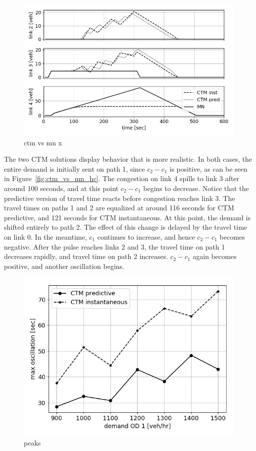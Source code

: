 \begin{figure}[h]
    \centering
    \includegraphics[width=\linewidth]{figs/ctm_vs_mn_x.png}
    \caption{ctm vs mn x}
    \label{fig:ctm_vs_mn_x}
\end{figure}
The two CTM solutions display behavior that is more realistic. In both cases, the entire demand is initially sent on path 1, since $c_2-c_1$ is positive, as can be seen in Figure~\ref{fig:ctm_vs_mn_hc}. The congestion on link 4 spills to link 3 after around 100 seconds, and at this point $c_2-c_1$ begins to decrease. Notice that the predictive version of travel time reacts before congestion reaches link 3. The travel times on paths 1 and 2 are equalized at around 116 seconds for CTM predictive, and 121 seconds for CTM instantaneous. At this point, the demand is shifted entirely to path 2. The effect of this change is delayed by the travel time on link 0. In the meantime, $c_1$ continues to increase, and hence $c_2-c_1$ becomes negative. After the pulse reaches links 2 and 3, the travel time on path 1 decreases rapidly, and travel time on path 2 increases. $c_2-c_1$ again becomes positive, and another oscillation begins. 

\begin{figure}[h]
    \centering
    \includegraphics[width=0.9\linewidth]{figs/peaks.png}
    \caption{peaks }
    \label{fig:peaks}
\end{figure}

